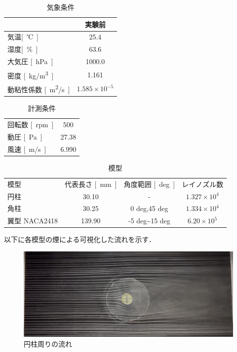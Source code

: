\documentclass[a4paper,titlepage]{ltjsarticle}
\begin{document}
\begin{table}[hbtp]
  \caption{気象条件}
  \centering
  \begin{tabular}{lc}
    \toprule
    &実験前 \\
    \hline
    気温{\si{[℃]}} &25.4\\
  湿度{\si{[\%]}} & 63.6\\
  大気圧 {\si{[hPa]}} & 1000.0\\
  密度 {\si{[kg/m^3]}}& 1.161\\
  動粘性係数 {\si{[m^2/s]}} & $1.585\times10^{-5}$\\
  \bottomrule
  \end{tabular}
\end{table}

\begin{table}[hbtp]
  \caption{計測条件}
  \centering
  \begin{tabular}{lc}
    \toprule
    回転数 {\si{[rpm]}} & 500\\
    動圧 {\si{[Pa]}} & 27.38\\
    風速 {\si{[m/s]}} & 6.990\\
    \bottomrule
  \end{tabular}
\end{table}

\begin{table}[hbtp]
  \caption{模型}
  \centering
  \begin{tabular}{lccc}
    \toprule
    模型 & 代表長さ {\si{[mm]}} & 角度範囲 {\si{[deg]}} & レイノズル数\\
    円柱 & 30.10& - & $1.327\times 10^4$\\
    角柱 & 30.25 &0{ \si{deg}},45{ \si{deg}} &$1.334\times 10^4$\\
    翼型 NACA2418 & 139.90 & -5{ \si{deg}}\sim15{ \si{deg}} & $6.20\times10^5$\\
    \bottomrule
  \end{tabular}
\end{table}

以下に各模型の煙による可視化した流れを示す．
\begin{figure}[hbtp]
  \centering
  \includegraphics[width=12cm]{円柱周りの流れ.jpg}
  \caption{円柱周りの流れ}
  \label{円柱周りの流れ}
\end{figure}
\end{document}
